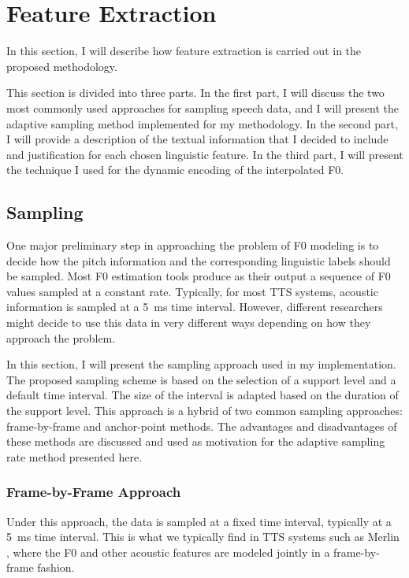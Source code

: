 

\chapter{Feature Extraction}\label{chap:feature-extraction}

 In this section, I will describe how feature extraction is carried out in the proposed methodology.
 
This section is divided into three parts.
In the first part, I will discuss the two most commonly used approaches for sampling speech data, and I will present the adaptive sampling method implemented for my methodology.
In the second part, I will provide a description of the textual information that I decided to include and justification for each chosen linguistic feature.
In the third part, I will present the technique I used for the dynamic encoding of the interpolated \ac{F0}.

\section{Sampling}

One major preliminary step in approaching the problem of \ac{F0} modeling is to decide how the pitch information and the corresponding linguistic labels should be sampled.
Most \ac{F0} estimation tools produce as their output a sequence of \ac{F0} values sampled at a constant rate.
Typically, for most \ac{TTS} systems, acoustic information is sampled at a 5~ms time interval.
However, different researchers might decide to use this data in very different ways depending on how they approach the problem.

In this section, I will present the sampling approach used in my implementation.
The proposed sampling scheme is based on the selection of a support level and a default time interval. 
The size of the interval is adapted based on the duration of the support level.
This approach is a hybrid of two common sampling approaches: frame-by-frame and anchor-point methods.
The advantages and disadvantages of these methods are discussed and used as motivation for the adaptive sampling rate method presented here.

\subsection{Frame-by-Frame Approach}

Under this approach, the data is sampled at a fixed time interval, typically at a 5~ms time interval.
This is what we typically find in \ac{TTS} systems such as Merlin \citep{Wu2016Merlin}, where the \ac{F0} and other acoustic features are modeled jointly in a frame-by-frame fashion. 

